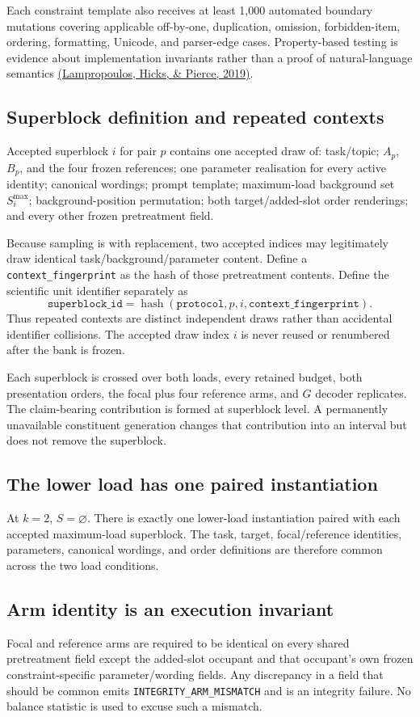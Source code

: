 \documentclass[11pt,a4paper]{article}
\newcommand{\ARMMISMATCH}{\texttt{INTEGRITY\_ARM\_\allowbreak MISMATCH}}
\begin{document}
Each constraint template also receives at least 1,000 automated boundary mutations covering applicable off-by-one, duplication, omission, forbidden-item, ordering, formatting, Unicode, and parser-edge cases. Property-based testing is evidence about implementation invariants rather than a proof of natural-language semantics \href{https://doi.org/10.1145/3360607}{(Lampropoulos, Hicks, \& Pierce, 2019)}.

\subsection{Superblock definition and repeated contexts}
Accepted superblock $i$ for pair $p$ contains one accepted draw of: task/topic; $A_p$, $B_p$, and the four frozen references; one parameter realisation for every active identity; canonical wordings; prompt template; maximum-load background set $S_i^{\max}$; background-position permutation; both target/added-slot order renderings; and every other frozen pretreatment field.

Because sampling is with replacement, two accepted indices may legitimately draw identical task/background/parameter content. Define a \texttt{context\_fingerprint} as the hash of those pretreatment contents. Define the scientific unit identifier separately as
\[
\texttt{superblock\_id}=\operatorname{hash}(\texttt{protocol},p,i,\texttt{context\_fingerprint}).
\]
Thus repeated contexts are distinct independent draws rather than accidental identifier collisions. The accepted draw index $i$ is never reused or renumbered after the bank is frozen.

Each superblock is crossed over both loads, every retained budget, both presentation orders, the focal plus four reference arms, and $G$ decoder replicates. The claim-bearing contribution is formed at superblock level. A permanently unavailable constituent generation changes that contribution into an interval but does not remove the superblock.

\subsection{The lower load has one paired instantiation}
At $k=2$, $S=\varnothing$. There is exactly one lower-load instantiation paired with each accepted maximum-load superblock. The task, target, focal/reference identities, parameters, canonical wordings, and order definitions are therefore common across the two load conditions.

\subsection{Arm identity is an execution invariant}
Focal and reference arms are required to be identical on every shared pretreatment field except the added-slot occupant and that occupant's own frozen constraint-specific parameter/wording fields. Any discrepancy in a field that should be common emits \ARMMISMATCH{} and is an integrity failure. No balance statistic is used to excuse such a mismatch.
\end{document}
